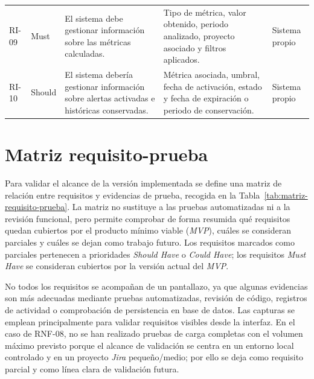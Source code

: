 {\begin{longtable}{p{1.2cm}p{1.65cm}p{4.6cm}p{3.35cm}p{1.65cm}}
RI-09 & Must & El sistema debe gestionar información sobre las métricas calculadas. & Tipo de métrica, valor obtenido, periodo analizado, proyecto asociado y filtros aplicados. & Sistema propio \\
RI-10 & Should & El sistema debería gestionar información sobre alertas activadas e históricas conservadas. & Métrica asociada, umbral, fecha de activación, estado y fecha de expiración o periodo de conservación. & Sistema propio \\
\bottomrule
\end{longtable}
\vspace{0.45em}
}

\FloatBarrier
\section{Matriz requisito-prueba}

Para validar el alcance de la versión implementada se define una matriz de relación entre requisitos y evidencias de prueba, recogida en la Tabla~\ref{tab:matriz-requisito-prueba}. La matriz no sustituye a las pruebas automatizadas ni a la revisión funcional, pero permite comprobar de forma resumida qué requisitos quedan cubiertos por el producto mínimo viable (\textit{MVP}), cuáles se consideran parciales y cuáles se dejan como trabajo futuro. Los requisitos marcados como parciales pertenecen a prioridades \textit{Should Have} o \textit{Could Have}; los requisitos \textit{Must Have} se consideran cubiertos por la versión actual del \textit{MVP}.

No todos los requisitos se acompañan de un pantallazo, ya que algunas evidencias son más adecuadas mediante pruebas automatizadas, revisión de código, registros de actividad o comprobación de persistencia en base de datos. Las capturas se emplean principalmente para validar requisitos visibles desde la interfaz. En el caso de RNF-08, no se han realizado pruebas de carga completas con el volumen máximo previsto porque el alcance de validación se centra en un entorno local controlado y en un proyecto \textit{Jira} pequeño/medio; por ello se deja como requisito parcial y como línea clara de validación futura.

